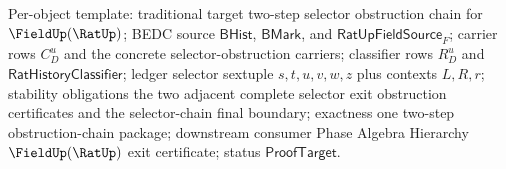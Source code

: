 Per-object template: traditional target two-step selector obstruction chain for
$\FieldUp(\RatUp)$; BEDC source $\mathsf{BHist}$, $\mathsf{BMark}$, and
$\mathsf{RatUpFieldSource}_F$; carrier rows $C_D^u$ and the concrete
selector-obstruction carriers; classifier rows $R_D^u$ and
$\mathsf{RatHistoryClassifier}$; ledger selector sextuple $s,t,u,v,w,z$ plus
contexts $L,R,r$; stability obligations the two adjacent complete selector exit
obstruction certificates and the selector-chain final boundary; exactness one
two-step obstruction-chain package; downstream consumer Phase Algebra Hierarchy
$\FieldUp(\RatUp)$ exit certificate; status $\mathsf{ProofTarget}$.
